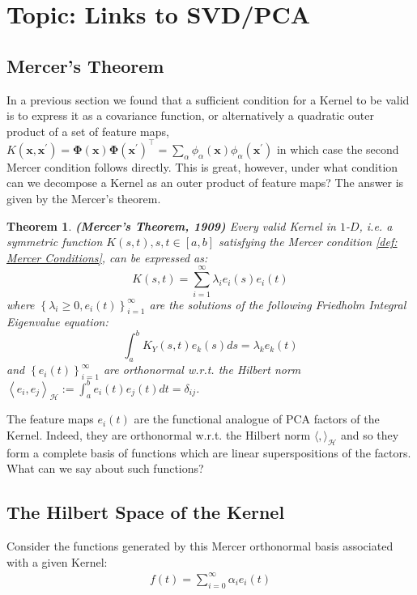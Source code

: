 \documentclass[11pt]{article}
\theoremstyle{plain} %
\newtheorem{theorem}{Theorem}[section]
\theoremstyle{remark}
\begin{document}
\section{Topic: Links to SVD/PCA}
\subsection{Mercer's Theorem}
In a previous section we found that a sufficient condition for a Kernel to be
valid is to express it as a covariance function, or alternatively a quadratic
outer product of a set of feature maps, $K\left(\mathbf{x},
  \mathbf{x}^{\prime}\right)=\boldsymbol{\Phi}(\mathbf{x})
  \boldsymbol{\Phi}\left(\mathbf{x}^{\prime}\right)^\top=\sum_{\alpha}
  \phi_{\alpha}(\mathbf{x}) \phi_{\alpha}\left(\mathbf{x}^{\prime}\right)$ in
which case the second Mercer condition follows directly. This is great, however, under what condition
can we decompose a Kernel as an outer product of feature maps? The answer is given by the Mercer's theorem.

\begin{theorem}\textbf{(Mercer's Theorem, 1909)}
  Every valid Kernel in $1$-$D$, i.e. a symmetric function $K(s, t), s, t \in[a, b]$ satisfying the Mercer condition \cref{def: Mercer Conditions}, can be expressed
  as:
  $$
    K(s, t)=\sum_{i=1}^{\infty} \lambda_{i} e_{i}(s) e_{i}(t)
  $$
  where $\left\{\lambda_{i} \geq 0, e_{i}(t)\right\}_{i=1}^{\infty}$ are the
  solutions of the following Friedholm Integral Eigenvalue equation:
  $$
    \int_{a}^{b} K_{Y}(s, t) e_{k}(s) d s=\lambda_{k} e_{k}(t)
  $$
  and $\left\{e_{i}(t)\right\}_{i=1}^{\infty}$ are orthonormal w.r.t. the Hilbert
  norm $\left\langle e_{i}, e_{j}\right\rangle_{\mathcal{H}}:=\int_{a}^{b} e_{i}(t)
    e_{j}(t) d t=\delta_{i j}$.
\end{theorem}

The feature maps $e_{i}(t)$ are the functional analogue of PCA factors of the
Kernel. Indeed, they are orthonormal w.r.t. the Hilbert norm
$\langle,\rangle_{\mathcal{H}}$ and so they form a complete basis of functions
which are linear superspositions of the factors. What can we say about such
functions?
\subsection{The Hilbert Space of the Kernel}
Consider the functions generated by this Mercer orthonormal basis associated
with a given Kernel:
\begin{align}
  f(t)=\sum_{i=0}^{\infty} \alpha_{i} e_{i}(t)
  \label{eq: functions generated by this Mercer orthonormal basis}
\end{align}
  
\end{document}
